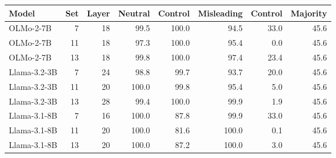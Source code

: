 \begin{tabular}{@{}lrrrrrrr@{}}
\toprule
Model & Set & Layer & Neutral & Control & Misleading & Control & Majority \\
\midrule
OLMo-2-7B & 7 & 18 & 99.5 & 100.0 & 94.5 & 33.0 & 45.6 \\
OLMo-2-7B & 11 & 18 & 97.3 & 100.0 & 95.4 & 0.0 & 45.6 \\
OLMo-2-7B & 13 & 18 & 99.8 & 100.0 & 97.4 & 23.4 & 45.6 \\
Llama-3.2-3B & 7 & 24 & 98.8 & 99.7 & 93.7 & 20.0 & 45.6 \\
Llama-3.2-3B & 11 & 20 & 100.0 & 99.8 & 95.4 & 5.0 & 45.6 \\
Llama-3.2-3B & 13 & 28 & 99.4 & 100.0 & 99.9 & 1.9 & 45.6 \\
Llama-3.1-8B & 7 & 16 & 100.0 & 87.8 & 99.9 & 33.0 & 45.6 \\
Llama-3.1-8B & 11 & 20 & 100.0 & 81.6 & 100.0 & 0.1 & 45.6 \\
Llama-3.1-8B & 13 & 20 & 100.0 & 87.2 & 100.0 & 3.0 & 45.6 \\
\bottomrule
\end{tabular}
